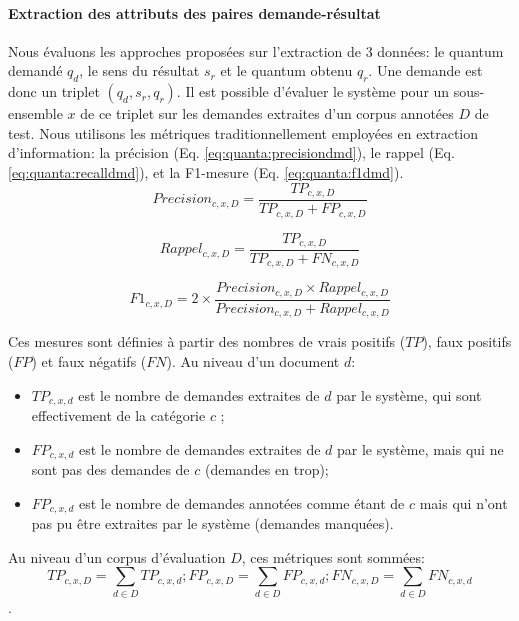 \paragraph{Extraction des attributs des paires demande-résultat}
 Nous évaluons les approches proposées sur l'extraction de 3 données: le quantum demandé $q_d$, le sens du résultat $s_r$ et le quantum obtenu $q_r$. Une demande est donc un triplet $(q_d, s_r, q_r)$. Il est possible d'évaluer le système pour un sous-ensemble $x$ de ce triplet sur les demandes extraites d'un corpus annotées $D$ de test. Nous utilisons les métriques traditionnellement employées en extraction d'information: la précision (Eq. \ref{eq:quanta:precisiondmd}), le rappel (Eq. \ref{eq:quanta:recalldmd}), et la F1-mesure (Eq. \ref{eq:quanta:f1dmd}). 
 \begin{equation}
 Precision_{c,x,D} = \frac{TP_{c,x,D}}{TP_{c,x,D} + FP_{c,x,D}}  \label{eq:quanta:precisiondmd}
\end{equation}

\begin{equation}
Rappel_{c,x,D} = \frac{TP_{c,x,D}}{TP_{c,x,D} + FN_{c,x,D}} \label{eq:quanta:recalldmd}
\end{equation}

\begin{equation}
F1_{c,x,D} =2 \times \frac{Precision_{c,x,D} \times Rappel_{c,x,D}}{Precision_{c,x,D} + Rappel_{c,x,D}} \label{eq:quanta:f1dmd}
\end{equation}

Ces mesures sont définies à partir des nombres de vrais positifs ($TP$), faux positifs ($FP$) et faux négatifs ($FN$). Au niveau d'un document $d$:
\begin{itemize}
\item  $TP_{c, x, d}$ est le nombre de demandes extraites de $d$ par le système, qui sont effectivement de la catégorie $c$ ;
\item  $FP_{c, x, d}$ est le nombre de demandes extraites de $d$ par le système, mais qui ne sont pas des demandes de $c$ (demandes en trop);
\item  $FP_{c, x, d}$ est le nombre de demandes annotées comme étant de $c$ mais qui n'ont pas pu être extraites par le système (demandes manquées).
\end{itemize}

Au niveau d'un corpus d'évaluation $D$, ces métriques sont sommées: 
\[TP_{c,x,D} = \sum\limits_{d \in D} TP_{c,x,d}; FP_{c,x,D} = \sum\limits_{d \in D} FP_{c,x,d}; FN_{c,x,D} = \sum\limits_{d \in D} FN_{c,x,d}\].

